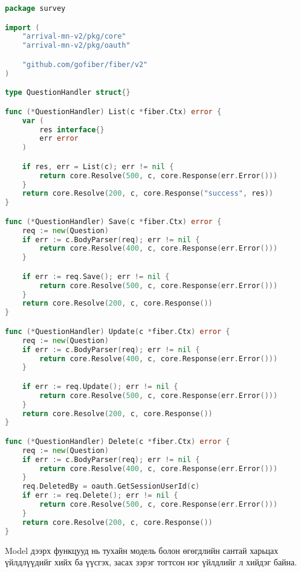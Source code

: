 \begin{lstlisting}[language=Go, caption=Модулийн Handler, frame=single]
package survey

import (
	"arrival-mn-v2/pkg/core"
	"arrival-mn-v2/pkg/oauth"

	"github.com/gofiber/fiber/v2"
)

type QuestionHandler struct{}

func (*QuestionHandler) List(c *fiber.Ctx) error {
	var (
		res interface{}
		err error
	)

	if res, err = List(c); err != nil {
		return core.Resolve(500, c, core.Response(err.Error()))
	}
	return core.Resolve(200, c, core.Response("success", res))
}

func (*QuestionHandler) Save(c *fiber.Ctx) error {
	req := new(Question)
	if err := c.BodyParser(req); err != nil {
		return core.Resolve(400, c, core.Response(err.Error()))
	}

	if err := req.Save(); err != nil {
		return core.Resolve(500, c, core.Response(err.Error()))
	}
	return core.Resolve(200, c, core.Response())
}

func (*QuestionHandler) Update(c *fiber.Ctx) error {
	req := new(Question)
	if err := c.BodyParser(req); err != nil {
		return core.Resolve(400, c, core.Response(err.Error()))
	}

	if err := req.Update(); err != nil {
		return core.Resolve(500, c, core.Response(err.Error()))
	}
	return core.Resolve(200, c, core.Response())
}

func (*QuestionHandler) Delete(c *fiber.Ctx) error {
	req := new(Question)
	if err := c.BodyParser(req); err != nil {
		return core.Resolve(400, c, core.Response(err.Error()))
	}
	req.DeletedBy = oauth.GetSessionUserId(c)
	if err := req.Delete(); err != nil {
		return core.Resolve(500, c, core.Response(err.Error()))
	}
	return core.Resolve(200, c, core.Response())
}
\end{lstlisting}

Model дээрх функцууд нь тухайн модель болон өгөгдлийн сантай харьцах үйлдлүүдийг хийх ба үүсгэх, засах зэрэг тогтсон нэг үйлдлийг л хийдэг байна. 


